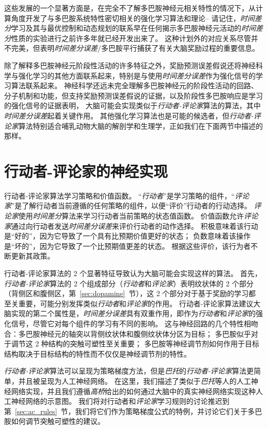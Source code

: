 这些发展的一个显著方面是，在完全不了解多巴胺神经元相关特性的情况下，从计算角度开发了与多巴胺系统特性密切相关的强化学习算法和理论-- 请记住，\textit{时间差分}学习及其与最优控制和动态规划的联系早在任何揭示多巴胺神经元活动的\textit{时间差分}性质的实验进行之前许多年就已经开发出来了。
这种计划外的对应关系尽管并不完美，但表明\textit{时间差分误差}/多巴胺平行捕获了有关大脑奖励过程的重要信息。


除了解释多巴胺神经元阶段性活动的许多特征之外，奖励预测误差假说还将神经科学与强化学习的其他方面联系起来，特别是与使用\textit{时间差分误差}作为强化信号的学习算法联系起来。
神经科学还远未完全理解多巴胺神经元的阶段性活动的回路、分子机制和功能，但支持奖励预测误差假说的证据，以及阶段性多巴胺响应是学习的强化信号的证据表明， 大脑可能会实现类似于\textit{行动者-评论家}算法的算法，其中\textit{时间差分误差}起着关键作用。
其他强化学习算法也是可能的候选者，但\textit{行动者-评论家}算法特别适合哺乳动物大脑的解剖学和生理学，正如我们在下面两节中描述的那样。



\section{行动者-评论家的神经实现} \label{sec:neural_ac}

行动者-评论家算法学习策略和价值函数。
“\textit{行动者}”是学习策略的组件，“\textit{评论家}”是了解行动者当前遵循的任何策略的组件，以便“评价”行动者的行动选择。
\textit{评论家}使用\textit{时间差分}算法来学习行动者当前策略的状态值函数。
价值函数允许\textit{评论家}通过向行动者发送\textit{时间差分误差}来评价行动者的动作选择。
积极意味着该行动是“好的”，因为它导致了一个具有比预期价值更好的状态；
负数意味着该操作是“坏的”，因为它导致了一个比预期值更差的状态。
根据这些评价，该行为者不断更新其政策。


行动者-评论家算法的 2 个显著特征导致认为大脑可能会实现这样的算法。
首先，\textit{行动者-评论家}算法的 2 个组成部分（\textit{行动者}和\textit{评论家}）表明纹状体的 2 个部分（背侧区和腹侧区，第~\ref{sec:dopamine}~节），这 2 个部分对于基于奖励的学习都至关重要，可能分别发挥类似\textit{行动者}和\textit{评论家}的作用。
行动者-评论家算法建议大脑实现的第二个属性是，\textit{时间差分误差}具有双重作用，即作为\textit{行动者}和\textit{评论家}的强化信号，尽管它对每个组件的学习有不同的影响。
这与神经回路的几个特性相吻合：多巴胺神经元的轴突以背侧纹状体和腹侧纹状体分区为目标；
多巴胺似乎对于调节这 2 种结构的突触可塑性至关重要；
多巴胺等神经调节剂如何作用于目标结构取决于目标结构的特性而不仅仅是神经调节剂的特性。


\textit{行动者-评论家}算法可以呈现为策略梯度方法，但是\textit{巴托}\cite{barto13neuron}的\textit{行动者-评论家}算法更简单，并且被呈现为人工神经网络。
在这里，我们描述了类似于\textit{巴托}等人的人工神经网络实现，并且我们遵循\textit{高桥}\cite{takahashi2008silencing}给出的如何通过大脑中的真实神经网络实现这种人工神经网络的示意图。
我们将对行动者和\textit{评论家}学习规则的讨论推迟到第~\ref{sec:ac_rules}~节，我们将它们作为策略梯度公式的特例，并讨论它们关于多巴胺如何调节突触可塑性的建议。


